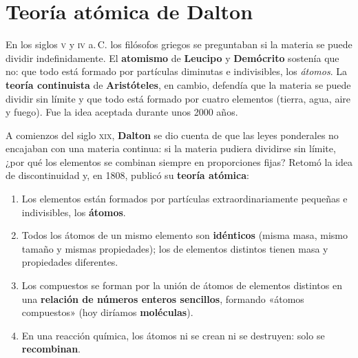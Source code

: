 \section{Teoría atómica de Dalton}\label{sec:ud1-dalton}

En los siglos \textsc{v} y \textsc{iv} a.\,C. los filósofos griegos se preguntaban si la materia se puede dividir
indefinidamente. El \textbf{atomismo} de \textbf{Leucipo} y \textbf{Demócrito} sostenía que no: que todo está formado por
partículas diminutas e indivisibles, los \emph{átomos}. La \textbf{teoría continuista} de \textbf{Aristóteles}, en cambio,
defendía que la materia se puede dividir sin límite y que todo está formado por cuatro elementos (tierra, agua, aire y fuego).
Fue la idea aceptada durante unos 2000 años.

A comienzos del siglo \textsc{xix}, \textbf{Dalton} se dio cuenta de que las leyes ponderales no encajaban con una materia
continua: si la materia pudiera dividirse sin límite, ¿por qué los elementos se combinan siempre en proporciones fijas? Retomó
la idea de discontinuidad y, en 1808, publicó su \textbf{teoría atómica}:

\begin{definition}
    \leavevmode %
    \begin{enumerate}[label=\numberballblue]
        \item Los elementos están formados por partículas extraordinariamente pequeñas e indivisibles, los \textbf{átomos}.
        \item Todos los átomos de un mismo elemento son \textbf{idénticos} (misma masa, mismo tamaño y mismas propiedades); los
        de elementos distintos tienen masa y propiedades diferentes.
        \item Los compuestos se forman por la unión de átomos de elementos distintos en una \textbf{relación de números enteros
        sencillos}, formando «átomos compuestos» (hoy diríamos \textbf{moléculas}).
        \item En una reacción química, los átomos ni se crean ni se destruyen: solo se \textbf{recombinan}.
    \end{enumerate}
\end{definition}

